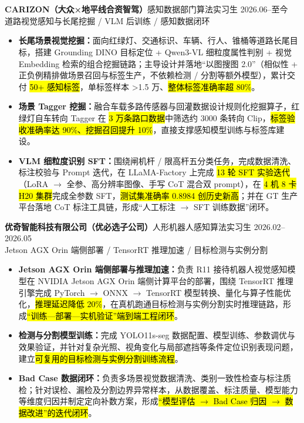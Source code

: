 \section[实习经历]{}
{\small\textbf{CARIZON（大众×地平线合资智驾）}}\quad 感知数据部门算法实习生 \hfill {2026.06--至今}\\
{\scriptsize\color{WHU_Blue} 道路视觉感知与长尾挖掘 / VLM 后训练 / 感知数据闭环}
\begin{itemize}
    \item \textbf{长尾场景视觉挖掘：}面向红绿灯、交通标识、车辆、行人、锥桶等道路长尾目标，搭建 Grounding DINO 目标定位 + Qwen3-VL 细粒度属性判别 + 视觉 Embedding 检索的组合挖掘链路；主导设计并落地“以图搜图 2.0”（相似性 + 正负例精排做场景召回与标签生产，不依赖检测 / 分割等额外模型），累计交付 \hl{50+ 感知标签}，单标签样本 >1.5 万、\hl{整体标签准确率超 80\%}。
    \item \textbf{场景 Tagger 挖掘：}融合车载多路传感器与回灌数据设计规则化挖掘算子，红绿灯自车转向 Tagger 在 \hl{3 万条路口数据}中筛选约 3000 条转向 Clip，\hl{标签验收准确率达 90\%、挖掘召回提升 10\%}，直接支撑感知模型训练与标签库建设。
    \item \textbf{VLM 细粒度识别 SFT：}围绕闸机杆 / 限高杆五分类任务，完成数据清洗、标注校验与 Prompt 迭代，在 LLaMA-Factory 上完成 \hl{13 轮 SFT 实验迭代}（LoRA $\rightarrow$ 全参、高分辨率图像、手写 CoT 混合双 prompt），在 \hl{4 机 8 卡 H20 集群}完成全参数 SFT，\hl{测试集准确率 0.8984 创历史新高}；并在 GT 生产平台落地 CoT 标注工具链，形成“人工标注 $\rightarrow$ SFT 训练数据”闭环。
\end{itemize}

\vspace{0.30em}
{\small\textbf{优奇智能科技有限公司（优必选子公司）}}\quad 人形机器人感知算法实习生 \hfill {2026.02--2026.05} \\
{\scriptsize\color{WHU_Blue} Jetson AGX Orin 端侧部署 / TensorRT 推理加速 / 目标检测与实例分割}
\begin{itemize}
    \item \textbf{Jetson AGX Orin 端侧部署与推理加速：}负责 R11 接待机器人视觉感知模型在 NVIDIA Jetson AGX Orin 端侧计算平台的部署，围绕 TensorRT 推理引擎完成 PyTorch $\rightarrow$ ONNX $\rightarrow$ TensorRT 模型转换、量化与算子性能优化，\hl{推理延迟降低 20\%}，在真机跑通目标检测与实例分割实时推理链路，形成\hl{“训练—部署—实机验证”端到端工程闭环}。
    \item \textbf{检测与分割模型训练：}完成 YOLO11s-seg 数据配置、模型训练、参数调优与效果验证，并针对复杂光照、视角变化与局部遮挡等条件定位识别表现问题，建立\hl{可复用的目标检测与实例分割训练流程}。
    \item \textbf{Bad Case 数据闭环：}负责多场景视觉数据清洗、类别一致性检查与标注质检；针对误检、漏检及分割边界异常样本，从数据覆盖、标注质量、模型能力等维度归因并制定定向补数方案，形成\hl{“模型评估 $\rightarrow$ Bad Case 归因 $\rightarrow$ 数据改进”的迭代闭环}。
\end{itemize}

